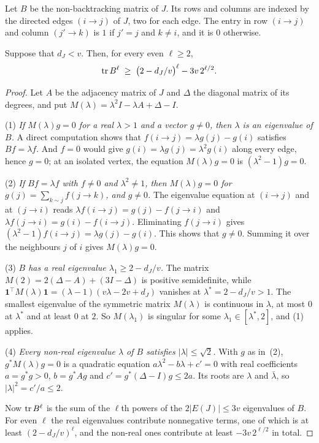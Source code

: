 \documentclass[11pt]{article}
\begin{document}
Let $B$ be the non-backtracking matrix of $J$. Its rows and columns are indexed by the directed
edges $(i\to j)$ of $J$, two for each edge. The entry in row $(i\to j)$ and column $(j'\to k)$ is
$1$ if $j'=j$ and $k\ne i$, and it is $0$ otherwise.

\begin{lemma}\label{lem:spectrum}
Suppose that $d_J<v$. Then, for every even $\ell\ge2$,
\[
  \operatorname{tr} B^{\ell}\;\ge\;\bigl(2-d_J/v\bigr)^{\ell}-3v\,2^{\ell/2}.
\]
\end{lemma}

\begin{proof}
Let $A$ be the adjacency matrix of $J$ and $\Delta$ the diagonal matrix of its degrees, and put
$M(\lambda)=\lambda^{2}I-\lambda A+\Delta-I$.

(1) \emph{If $M(\lambda)g=0$ for a real $\lambda>1$ and a vector $g\ne0$, then $\lambda$ is an
eigenvalue of $B$.} A direct computation shows that $f(i\to j)=\lambda g(j)-g(i)$ satisfies
$Bf=\lambda f$. And $f=0$ would give $g(i)=\lambda g(j)=\lambda^{2}g(i)$ along every edge, hence
$g=0$; at an isolated vertex, the equation $M(\lambda)g=0$ is $(\lambda^{2}-1)g=0$.

(2) \emph{If $Bf=\lambda f$ with $f\ne0$ and $\lambda^{2}\ne1$, then $M(\lambda)g=0$ for
$g(j)=\sum_{k\sim j}f(j\to k)$, and $g\ne0$.} The eigenvalue equation at $(i\to j)$ and at
$(j\to i)$ reads $\lambda f(i\to j)=g(j)-f(j\to i)$ and $\lambda f(j\to i)=g(i)-f(i\to j)$.
Eliminating $f(j\to i)$ gives $(\lambda^{2}-1)f(i\to j)=\lambda g(j)-g(i)$. This shows that
$g\ne0$. Summing it over the neighbours $j$ of $i$ gives $M(\lambda)g=0$.

(3) \emph{$B$ has a real eigenvalue $\lambda_1\ge2-d_J/v$.} The matrix
$M(2)=2(\Delta-A)+(3I-\Delta)$ is positive semidefinite, while
$\mathbf{1}^{\!\top}M(\lambda)\mathbf{1}=(\lambda-1)(v\lambda-2v+d_J)$ vanishes at
$\lambda^{*}=2-d_J/v>1$. The smallest eigenvalue of the symmetric matrix $M(\lambda)$ is continuous
in $\lambda$, at most $0$ at $\lambda^{*}$ and at least $0$ at $2$. So $M(\lambda_1)$ is singular for
some $\lambda_1\in[\lambda^{*},2]$, and (1) applies.

(4) \emph{Every non-real eigenvalue $\lambda$ of $B$ satisfies $|\lambda|\le\sqrt2$.} With $g$ as
in~(2), $g^{*}M(\lambda)g=0$ is a quadratic equation $a\lambda^{2}-b\lambda+c'=0$ with real
coefficients $a=g^{*}g>0$, $b=g^{*}Ag$ and $c'=g^{*}(\Delta-I)g\le2a$. Its roots are $\lambda$ and
$\bar\lambda$, so $|\lambda|^{2}=c'/a\le2$.

Now $\operatorname{tr} B^{\ell}$ is the sum of the $\ell$th powers of the $2|E(J)|\le3v$ eigenvalues of $B$. For
even $\ell$ the real eigenvalues contribute nonnegative terms, one of which is at least
$(2-d_J/v)^{\ell}$, and the non-real ones contribute at least $-3v\,2^{\ell/2}$ in total.
\end{proof}
\end{document}
